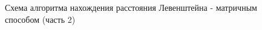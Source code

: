 \begin{figure}[h]
	\caption{Схема алгоритма нахождения расстояния Левенштейна - матричным способом (часть 2)}
	\label{img_matrix_2}
\end{figure}
\newpage

